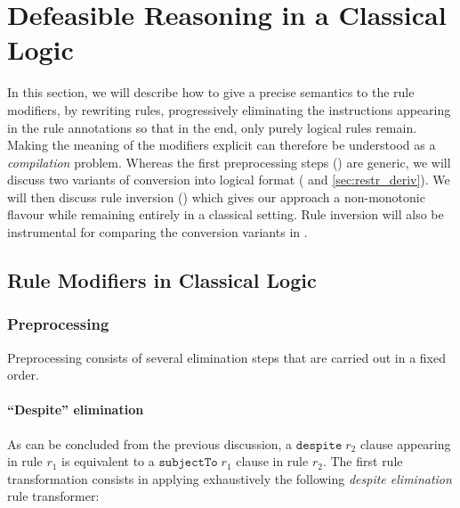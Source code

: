 \section{Defeasible Reasoning in a Classical Logic}\label{sec:defeasible_classical}

In this section, we will describe how to give a precise semantics to the rule
modifiers, by rewriting rules, progressively eliminating the instructions
appearing in the rule annotations so that in the end, only purely logical
rules remain. Making the meaning of the modifiers explicit can therefore be
understood as a \emph{compilation} problem.  Whereas the first preprocessing
steps () are generic, we will discuss two variants
of conversion into logical format ( and
\ref{sec:restr_deriv}). We will then discuss rule inversion
() which gives our approach a non-monotonic flavour
while remaining entirely in a classical setting. Rule inversion will also be
instrumental for comparing the conversion variants in .


\subsection{Rule Modifiers in Classical Logic}\label{sec:rule_modifiers_in_classical_logic}

\subsubsection{Preprocessing}\label{sec:preprocessing}

Preprocessing consists of several elimination steps that are carried out in a
fixed order.

\paragraph{\textbf{``Despite''  elimination}}

As can be concluded from the previous discussion, a
$\mathtt{despite}\; r_2$ clause appearing in rule $r_1$ is equivalent to a
$\mathtt{subjectTo}\; r_1$ clause in rule $r_2$. The first rule transformation
consists in applying exhaustively the following \emph{despite elimination}
rule transformer:

